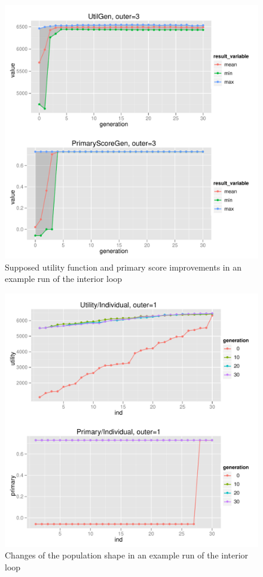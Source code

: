 \begin{figure}
  \centering
  \includegraphics[width=1\textwidth]{exp/uncert/pres_utilgen_03}
  \caption{Supposed utility function and primary score improvements in an example run of the
    interior loop}
  \label{pres_utilgen_03}
\end{figure}

\begin{figure}
  \centering
  \includegraphics[width=1\textwidth]{exp/uncert/pres_utilind_01}
  \caption{Changes of the population shape in an example run of the interior
    loop}
  \label{pres_utilind_01}
\end{figure}

